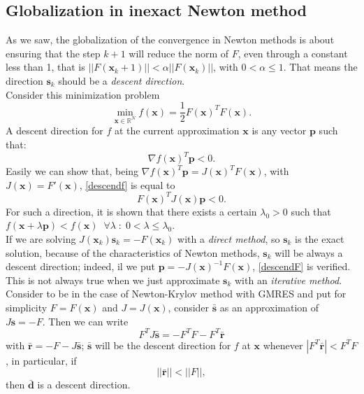 \subsection{Globalization in inexact Newton method}
As we saw, the globalization of the convergence in Newton methods is about ensuring that the step $k+1$ will reduce the norm of $F$, even through a constant less than 1, that is $||F(\textbf{x}_k+1)||< \alpha ||F(\textbf{x}_k)||$, with $0< \alpha \le 1$.
That means the direction $\textbf{s}_k$ should be a \textit{descent direction}. \\

Consider this minimization problem 
\begin{equation*}
\min_{\textbf{x} \in \mathbb{R}^N}{f(\textbf{x}) = \frac{1}{2} F(\textbf{x})^TF(\textbf{x})}.
\end{equation*}
A descent direction for $f$ at the current approximation $\textbf{x}$ is any vector $\textbf{p}$ such that:
\begin{equation}
\label{descendf}
\nabla f(\textbf{x})^T \textbf{p} < 0.
\end{equation}
Easily we can show that, being $\nabla f(\textbf{x})^T \textbf{p} = J(\textbf{x})^T F(\textbf{x})$, with $J(\textbf{x})= F'(\textbf{x})$, \eqref{descendf} is equal to 
\begin{equation}
\label{descendF}
F(\textbf{x})^T J(\textbf{x}) \textbf{p} < 0.
\end{equation}
For such a direction, it is shown that there exists a certain $\lambda_0 > 0$  such that $ f(\textbf{x} + \lambda \textbf{p}) < f(\textbf{x}) \; \; \forall \lambda \; : \; 0 < \lambda \le \lambda_0$. \\

If we are solving $J(\textbf{x}_{k}) \textbf{s}_k = - F(\textbf{x}_k)$ with a \textit{direct method}, so $\textbf{s}_k$ is the exact solution, because of the characteristics of Newton methods, $\textbf{s}_k$ will be always a descent direction; indeed, il we put $ \textbf{p} = - J(\textbf{x})^{-1} F(\textbf{x}) $, \eqref{descendF} is verified. This is not always true when we just approximate $\textbf{s}_k$ with an \textit{iterative method}. \\

Consider to be in the case of Newton-Krylov method with GMRES and put for simplicity $F=F(\textbf{x})$ and $J= J(\textbf{x})$, consider $\bar{\textbf{s}}$ as an approximation of $J\textbf{s} = - F$. Then we can write
\begin{equation*}
F^TJ\bar{\textbf{s}}= -F^TF - F^T\bar{\textbf{r}}
\end{equation*}  
with $\bar{\textbf{r}}=-F-J\bar{\textbf{s}}$; $ \bar{\textbf{s}}$ will be the descent direction for $f$ at $\textbf{x}$ whenever $|F^T\bar{\textbf{r}}|<F^TF$, in particular, if 
\begin{equation}
\label{conddescend}
||\bar{\textbf{r}}||<||F||,
\end{equation}
 then $\bar{\textbf{d}}$ is a descent direction. \\
 
